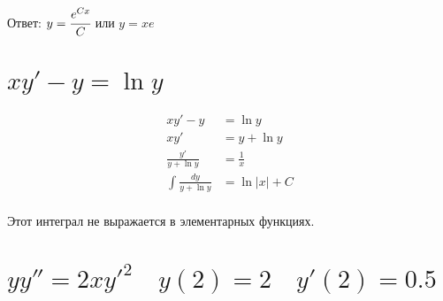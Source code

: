 Ответ: $y = \cfrac{e^{Cx}}{C}$ или $y = xe$


\section{$xy'-y=\ln y$}

\begin{align*}
    xy'-y                     & = \ln y       \\
    xy'                       & = y + \ln y   \\
    \frac{y'}{y + \ln y}      & = \frac{1}{x} \\
    \int \frac{dy}{y + \ln y} & = \ln |x| + C \\
\end{align*}

Этот интеграл не выражается в элементарных функциях.




\section{$yy''=2xy'^2 \quad y(2)=2 \quad y'(2)=0.5$}

